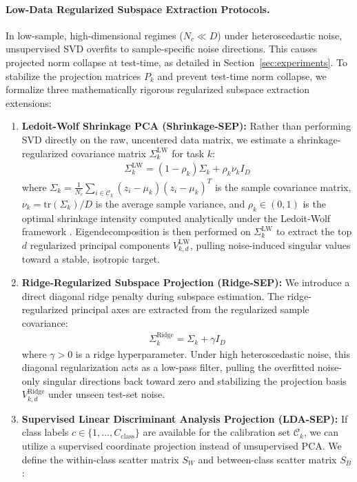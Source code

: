 \paragraph{Low-Data Regularized Subspace Extraction Protocols.}
In low-sample, high-dimensional regimes ($N_c \ll D$) under heteroscedastic noise, unsupervised SVD overfits to sample-specific noise directions. This causes projected norm collapse at test-time, as detailed in Section~\ref{sec:experiments}. To stabilize the projection matrices $P_k$ and prevent test-time norm collapse, we formalize three mathematically rigorous regularized subspace extraction extensions:
\begin{enumerate}
    \item \textbf{Ledoit-Wolf Shrinkage PCA (Shrinkage-SEP):} Rather than performing SVD directly on the raw, uncentered data matrix, we estimate a shrinkage-regularized covariance matrix $\Sigma_k^{\text{LW}}$ for task $k$:
    \begin{align}
        \Sigma_k^{\text{LW}} = (1 - \rho_k) \Sigma_k + \rho_k \nu_k I_D
    \end{align}
    where $\Sigma_k = \frac{1}{N_c} \sum_{i \in \mathcal{C}_k} (z_i - \mu_k)(z_i - \mu_k)^T$ is the sample covariance matrix, $\nu_k = \text{tr}(\Sigma_k) / D$ is the average sample variance, and $\rho_k \in (0, 1)$ is the optimal shrinkage intensity computed analytically under the Ledoit-Wolf framework \cite{ledoit2004well}. Eigendecomposition is then performed on $\Sigma_k^{\text{LW}}$ to extract the top $d$ regularized principal components $V_{k, d}^{\text{LW}}$, pulling noise-induced singular values toward a stable, isotropic target.
    \item \textbf{Ridge-Regularized Subspace Projection (Ridge-SEP):} We introduce a direct diagonal ridge penalty during subspace estimation. The ridge-regularized principal axes are extracted from the regularized sample covariance:
    \begin{align}
        \Sigma_k^{\text{Ridge}} = \Sigma_k + \gamma I_D
    \end{align}
    where $\gamma > 0$ is a ridge hyperparameter. Under high heteroscedastic noise, this diagonal regularization acts as a low-pass filter, pulling the overfitted noise-only singular directions back toward zero and stabilizing the projection basis $V_{k, d}^{\text{Ridge}}$ under unseen test-set noise.
    \item \textbf{Supervised Linear Discriminant Analysis Projection (LDA-SEP):} If class labels $c \in \{1,\dots, C_{\text{class}}\}$ are available for the calibration set $\mathcal{C}_k$, we can utilize a supervised coordinate projection instead of unsupervised PCA. We define the within-class scatter matrix $S_W$ and between-class scatter matrix $S_B$:

\end{enumerate}
